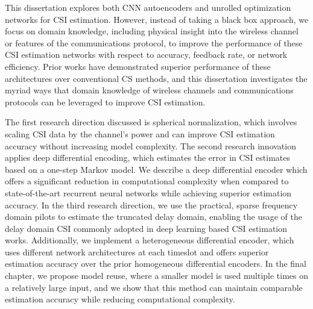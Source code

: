 This dissertation explores both CNN autoencoders and unrolled optimization networks for CSI estimation. However, instead of taking a black box approach, we focus on domain knowledge, including physical insight into the wireless channel or features of the communications protocol, to improve the performance of these CSI estimation networks with respect to accuracy, feedback rate, or network efficiency. Prior works have demonstrated superior performance of these architectures over conventional CS methods, and this dissertation investigates the myriad ways that domain knowledge of wireless channels and communications protocols can be leveraged to improve CSI estimation.

The first research direction discussed is spherical normalization, which involves scaling CSI data by the channel's power and can improve CSI estimation accuracy without increasing model complexity. The second research innovation applies deep differential encoding, which estimates the error in CSI estimates based on a one-step Markov model. We describe a deep differential encoder which offers a significant reduction in computational complexity when compared to state-of-the-art recurrent neural networks while achieving superior estimation accuracy. In the third research direction, we use the practical, sparse frequency domain pilots to estimate the truncated delay domain, enabling the usage of the delay domain CSI commonly adopted in deep learning based CSI estimation works. Additionally, we implement a heterogeneous differential encoder, which uses different network architectures at each timeslot and offers superior estimation accuracy over the prior homogeneous differential encoders. In the final chapter, we propose model reuse, where a smaller model is used multiple times on a relatively large input, and we show that this method can maintain comparable estimation accuracy while reducing computational complexity.